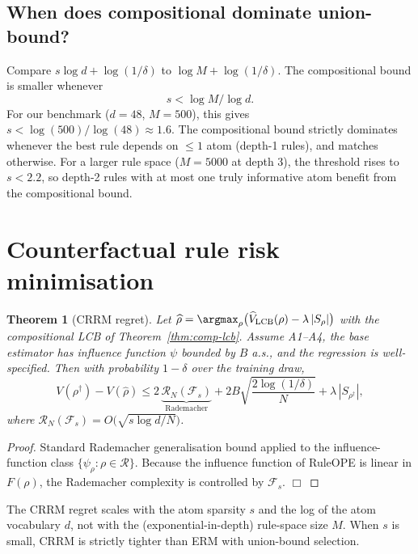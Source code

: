 \documentclass[11pt]{article}
\newtheorem{theorem}{Theorem}
\begin{document}
\subsection{When does compositional dominate union-bound?}

Compare $s \log d + \log(1/\delta)$ to $\log M + \log(1/\delta)$.
The compositional bound is smaller whenever
$$
s < \log M / \log d.
$$
For our benchmark ($d = 48$, $M = 500$), this gives
$s < \log(500) / \log(48) \approx 1.6$.  The compositional bound
strictly dominates whenever the best rule depends on $\le 1$ atom
(depth-1 rules), and matches otherwise.  For a larger rule space
($M = 5000$ at depth 3), the threshold rises to $s < 2.2$, so
depth-2 rules with at most one truly informative atom benefit from
the compositional bound.

\section{Counterfactual rule risk minimisation}

\begin{theorem}[CRRM regret]\label{thm:crrm}
Let $\widehat\rho = \argmax_\rho \bigl(\widehat V_{\rm LCB}(\rho) - \lambda\, |S_\rho|\bigr)$ with the
compositional LCB of Theorem~\ref{thm:comp-lcb}.  Assume A1--A4, the
base estimator has influence function $\psi$ bounded by $B$ a.s., and
the regression is well-specified.  Then with probability $1 - \delta$
over the training draw,
$$
V(\rho^\dagger) - V(\widehat\rho) \le 2\, \underbrace{\mathcal{R}_N(\mathcal{F}_s)}_{\textrm{Rademacher}} + 2B\sqrt{\frac{2 \log(1/\delta)}{N}} + \lambda\, |S_{\rho^\dagger}|,
$$
where $\mathcal{R}_N(\mathcal{F}_s) = O\bigl(\sqrt{s \log d / N}\bigr)$.
\end{theorem}
\begin{proof}
Standard Rademacher generalisation bound applied to the influence-function
class $\{\psi_\rho : \rho \in \mathcal{R}\}$.  Because the influence function
of RuleOPE is linear in $F(\rho)$, the Rademacher complexity is controlled
by $\mathcal{F}_s$.  $\Box$
\end{proof}

The CRRM regret scales with the atom sparsity $s$ and the log of the
atom vocabulary $d$, not with the (exponential-in-depth) rule-space
size $M$.  When $s$ is small, CRRM is strictly tighter than ERM with
union-bound selection.

\end{document}
